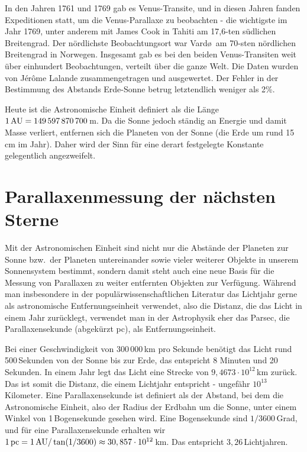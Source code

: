 In den Jahren 1761 und 1769 gab es Venus-Transite, und in diesen Jahren fanden Expeditionen
statt, um die Venus-Parallaxe zu beobachten - die wichtigste im Jahr 1769, unter anderem mit James
Cook in Tahiti am 17,6-ten s\"udlichen Breitengrad. Der n\"ordlichste 
Beobachtungsort war Vard\o\ am 70-sten n\"ordlichen Breitengrad in Norwegen. Insgesamt gab es bei
den beiden Venus-Transiten weit \"uber einhundert Beobachtungen, verteilt \"uber die ganze Welt. 
Die Daten wurden von 
J\'{e}r\^{o}me Lalande zusammengetragen und ausgewertet. Der Fehler in der
Bestimmung des Abstands Erde-Sonne betrug letztendlich weniger als 2\%. 

Heute ist die Astronomische Einheit definiert als die 
L\"ange $1\,{\rm AU}=149\,597\,870\,700$\,m. 
Da die Sonne jedoch st\"andig an Energie und damit Masse verliert, entfernen sich die Planeten
von der Sonne (die Erde um rund 15\,cm im Jahr). Daher wird der Sinn f\"ur eine derart festgelegte
Konstante gelegentlich angezweifelt. 

\section{Parallaxenmessung der n\"achsten Sterne}

Mit der Astronomischen Einheit sind nicht nur die Abst\"ande der Planeten zur Sonne bzw.\ der
Planeten untereinander sowie vieler weiterer Objekte in unserem Sonnensystem bestimmt, sondern damit
steht auch eine neue Basis f\"ur die Messung von Parallaxen zu weiter entfernten Objekten zur
Verf\"ugung. W\"ahrend man insbesondere in der popul\"arwissenschaftlichen Literatur das Lichtjahr 
gerne als astronomische Entfernungseinheit verwendet, also
die Distanz, die das Licht in einem Jahr zur\"ucklegt, verwendet man in der Astrophysik eher
das Parsec, die Parallaxensekunde (abgek\"urzt pc), als Entfernungseinheit. 

Bei einer Geschwindigkeit von 300\,000\,km pro Sekunde ben\"otigt das Licht rund 500\,Sekunden
von der Sonne bis zur Erde, das entspricht 8 Minuten und 20 Sekunden. In einem Jahr legt das
Licht eine Strecke von $9,4673\cdot 10^{12}$\,km zur\"uck. Das ist somit die Distanz, die einem 
Lichtjahr entspricht - ungef\"ahr $10^{13}$ Kilometer. 
Eine Parallaxensekunde ist definiert als
der Abstand, bei dem die Astronomische Einheit, also der Radius der Erdbahn um die Sonne, 
unter einem Winkel von 1\,Bogensekunde gesehen wird. Eine Bogensekunde sind $1/3600$\,Grad,
und f\"ur eine Parallaxensekunde erhalten wir 
$1\,{\rm pc}=1\,{\rm AU}/\tan (1/3600) \approx 30,857\cdot 10^{12}$\,km. 
Das entspricht $3,26$\,Lichtjahren.   

